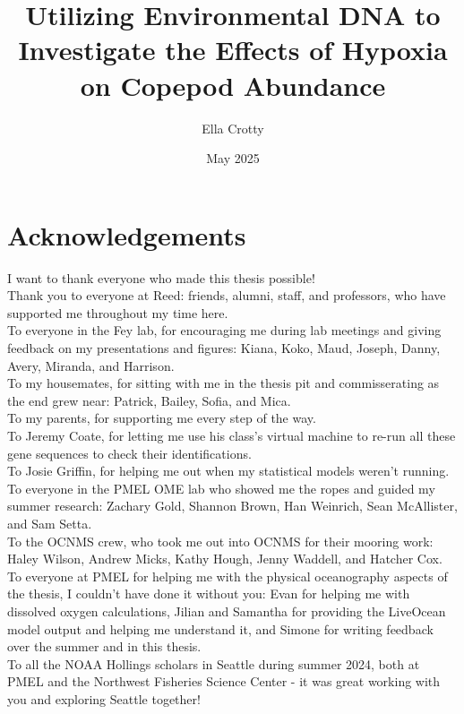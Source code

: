 \documentclass[12pt,twoside]{reedthesis}
\title{Utilizing Environmental DNA to Investigate the Effects of Hypoxia on Copepod Abundance}
\author{Ella Crotty}
\date{May 2025}
\begin{document}
  \maketitle
  \frontmatter %
  \pagestyle{empty} %

    \chapter*{Acknowledgements}
	I want to thank everyone who made this thesis possible! \\
	Thank you to everyone at Reed: friends, alumni, staff, and professors, who have supported me throughout my time here. \\
	To everyone in the Fey lab, for encouraging me during lab meetings and giving feedback on my presentations and figures: Kiana, Koko, Maud, Joseph, Danny, Avery, Miranda, and Harrison. \\
	To my housemates, for sitting with me in the thesis pit and commisserating as the end grew near: Patrick, Bailey, Sofia, and Mica. \\
	To my parents, for supporting me every step of the way. \\
	To Jeremy Coate, for letting me use his class's virtual machine to re-run all these gene sequences to check their identifications. \\
	To Josie Griffin, for helping me out when my statistical models weren't running. \\
	To everyone in the PMEL OME lab who showed me the ropes and guided my summer research: Zachary Gold, Shannon Brown, Han Weinrich, Sean McAllister, and Sam Setta. \\
	To the OCNMS crew, who took me out into OCNMS for their mooring work: Haley Wilson, Andrew Micks, Kathy Hough, Jenny Waddell, and Hatcher Cox. \\
	To everyone at PMEL for helping me with the physical oceanography aspects of the thesis, I couldn't have done it without you: Evan for helping me with dissolved oxygen calculations, Jilian and Samantha for providing the LiveOcean model output and helping me understand it, and Simone for writing feedback over the summer and in this thesis. \\
	To all the NOAA Hollings scholars in Seattle during summer 2024, both at PMEL and the Northwest Fisheries Science Center - it was great working with you and exploring Seattle together! \\
\end{document}
